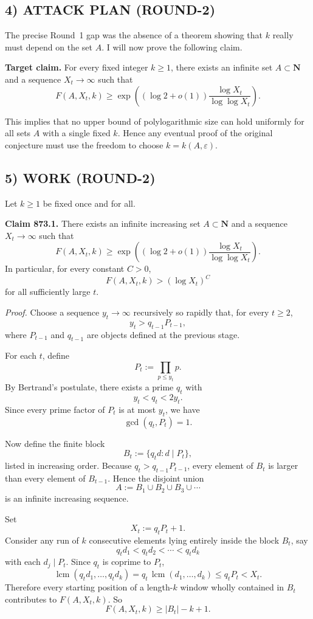 \subsection*{4) ATTACK PLAN (ROUND-2)}

The precise Round~1 gap was the absence of a theorem showing that \(k\) really must depend on the set \(A\). I will now prove the following claim.

\medskip
\noindent\textbf{Target claim.}
For every fixed integer \(k\ge 1\), there exists an infinite set \(A\subset \mathbf{N}\) and a sequence \(X_t\to\infty\) such that
\[
F(A,X_t,k)\ge \exp\!\left((\log 2+o(1))\frac{\log X_t}{\log\log X_t}\right).
\]

This implies that no upper bound of polylogarithmic size can hold uniformly for all sets \(A\) with a single fixed \(k\). Hence any eventual proof of the original conjecture must use the freedom to choose \(k=k(A,\varepsilon)\).

\subsection*{5) WORK (ROUND-2)}

Let \(k\ge 1\) be fixed once and for all.

\medskip
\noindent\textbf{Claim 873.1.}
There exists an infinite increasing set \(A\subset \mathbf{N}\) and a sequence \(X_t\to\infty\) such that
\[
F(A,X_t,k)\ge \exp\!\left((\log 2+o(1))\frac{\log X_t}{\log\log X_t}\right).
\]
In particular, for every constant \(C>0\),
\[
F(A,X_t,k)>(\log X_t)^C
\]
for all sufficiently large \(t\).

\medskip
\noindent\emph{Proof.}
Choose a sequence \(y_t\to\infty\) recursively so rapidly that, for every \(t\ge 2\),
\[
y_t>q_{t-1}P_{t-1},
\]
where \(P_{t-1}\) and \(q_{t-1}\) are objects defined at the previous stage.

For each \(t\), define
\[
P_t:=\prod_{p\le y_t}p.
\]
By Bertrand's postulate, there exists a prime \(q_t\) with
\[
y_t<q_t<2y_t.
\]
Since every prime factor of \(P_t\) is at most \(y_t\), we have
\[
\gcd(q_t,P_t)=1.
\]

Now define the finite block
\[
B_t:=\{q_t d:d\mid P_t\},
\]
listed in increasing order. Because \(q_t>q_{t-1}P_{t-1}\), every element of \(B_t\) is larger than every element of \(B_{t-1}\). Hence the disjoint union
\[
A:=B_1\cup B_2\cup B_3\cup \cdots
\]
is an infinite increasing sequence.

Set
\[
X_t:=q_tP_t+1.
\]
Consider any run of \(k\) consecutive elements lying entirely inside the block \(B_t\), say
\[
q_t d_1<q_t d_2<\cdots<q_t d_k
\]
with each \(d_j\mid P_t\). Since \(q_t\) is coprime to \(P_t\),
\[
\operatorname{lcm}(q_t d_1,\dots,q_t d_k)=q_t\,\operatorname{lcm}(d_1,\dots,d_k)\le q_tP_t<X_t.
\]
Therefore every starting position of a length-\(k\) window wholly contained in \(B_t\) contributes to \(F(A,X_t,k)\). So
\[
F(A,X_t,k)\ge |B_t|-k+1.
\]

